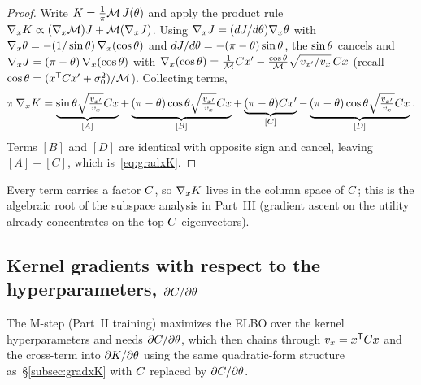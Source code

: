 \begin{proof}
Write $K=\tfrac1\pi\mathcal{M}\,J(\theta)$ and apply the product rule
$\nabla_xK\propto(\nabla_x\mathcal{M})J+\mathcal{M}(\nabla_xJ)$. Using
$\nabla_xJ=(dJ/d\theta)\nabla_x\theta$ with
$\nabla_x\theta=-(1/\sin\theta)\,\nabla_x(\cos\theta)$ and
$dJ/d\theta=-(\pi-\theta)\sin\theta$, the $\sin\theta$ cancels and
$\nabla_xJ=(\pi-\theta)\,\nabla_x(\cos\theta)$ with
$\nabla_x(\cos\theta)=\tfrac1{\mathcal{M}}C x'-\tfrac{\cos\theta}{\mathcal{M}}\sqrt{v_{x'}/v_x}\,C x$
(recall $\cos\theta=(x^{\mathsf{T}}C x'+\sigma_{0}^2)/\mathcal{M}$). Collecting terms,
\[
\pi\,\nabla_xK
=\underbrace{\sin\theta\sqrt{\tfrac{v_{x'}}{v_x}}C x}_{[A]}
+\underbrace{(\pi-\theta)\cos\theta\sqrt{\tfrac{v_{x'}}{v_x}}C x}_{[B]}
+\underbrace{(\pi-\theta)C x'}_{[C]}
-\underbrace{(\pi-\theta)\cos\theta\sqrt{\tfrac{v_{x'}}{v_x}}C x}_{[D]} .
\]
Terms $[B]$ and $[D]$ are identical with opposite sign and cancel, leaving
$[A]+[C]$, which is~\eqref{eq:gradxK}.
\end{proof}

Every term carries a factor $C$, so $\nabla_xK$ lives in the column space of
$C$; this is the algebraic root of the subspace analysis in Part~III (gradient
ascent on the utility already concentrates on the top $C$-eigenvectors).

\subsection{Kernel gradients with respect to the hyperparameters, $\partial C/\partial\theta$}
\label{subsec:dCtheta}

The M-step (Part~II training) maximizes the ELBO over the kernel hyperparameters and
needs $\partial C/\partial\theta$, which then chains through
$v_x=x^{\mathsf{T}}C x$ and the cross-term into $\partial K/\partial\theta$
using the same quadratic-form structure as~\S\ref{subsec:gradxK} with $C$
replaced by $\partial C/\partial\theta$.

